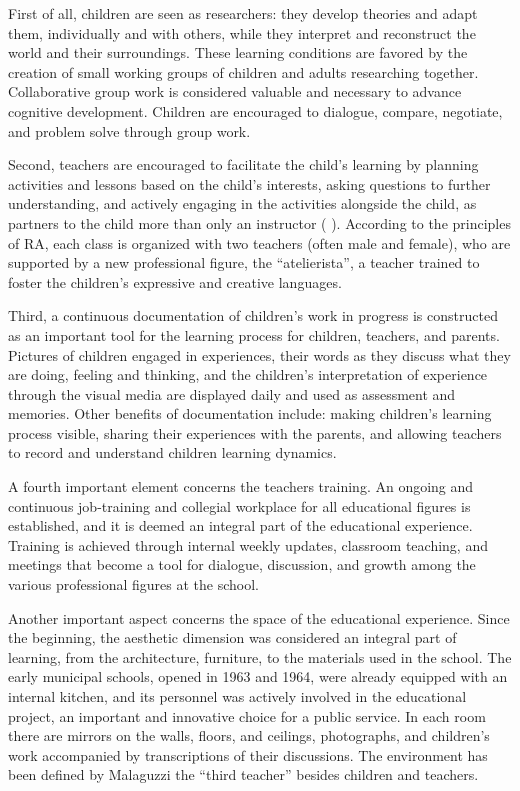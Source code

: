 \documentclass[12pt]{article}
\begin{document}
First of all, children are seen as researchers: they develop theories and
adapt them, individually and with others, while they interpret and
reconstruct the world and their surroundings. These learning conditions are
favored by the creation of small working groups of children and adults
researching together. Collaborative group work is considered valuable and
necessary to advance cognitive development. Children are encouraged to
dialogue, compare, negotiate, and problem solve through group work.

Second, teachers are encouraged to facilitate the child's learning by
planning activities and lessons based on the child's interests, asking
questions to further understanding, and actively engaging in the activities
alongside the child, as partners to the child more than only an instructor (%
\cite{Hewett2001}). According to the principles of RA, each class is
organized with two teachers (often male and female), who are supported by a
new professional figure, the ``atelierista'', a teacher trained to foster
the children's expressive and creative languages.

Third, a continuous documentation of children's work in progress is
constructed as an important tool for the learning process for children,
teachers, and parents. Pictures of children engaged in experiences, their
words as they discuss what they are doing, feeling and thinking, and the
children's interpretation of experience through the visual media are
displayed daily and used as assessment and memories. Other benefits of
documentation include: making children's learning process visible, sharing
their experiences with the parents, and allowing teachers to record and
understand children learning dynamics.

A fourth important element concerns the teachers training. An ongoing and
continuous job-training and collegial workplace for all educational figures
is established, and it is deemed an integral part of the educational
experience. Training is achieved through internal weekly updates, classroom
teaching, and meetings that become a tool for dialogue, discussion, and
growth among the various professional figures at the school.

Another important aspect concerns the space of the educational experience.
Since the beginning, the aesthetic dimension was considered an integral part
of learning, from the architecture, furniture, to the materials used in the
school. The early municipal schools, opened in 1963 and 1964, were already
equipped with an internal kitchen, and its personnel was actively involved
in the educational project, an important and innovative choice for a public
service. In each room there are mirrors on the walls, floors, and ceilings,
photographs, and children's work accompanied by transcriptions of their
discussions. The environment has been defined by Malaguzzi the ``third
teacher'' besides children and teachers.
\end{document}
